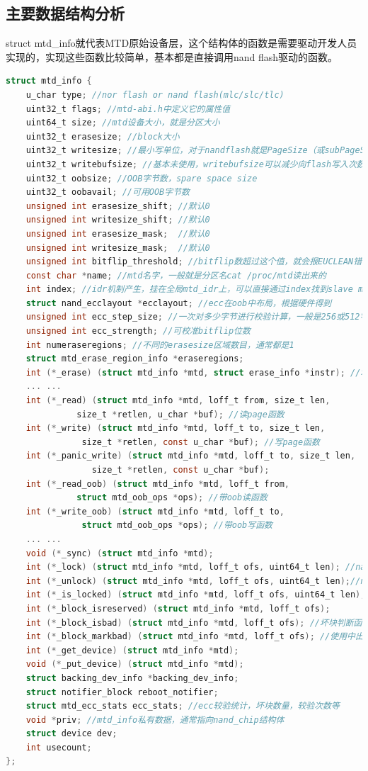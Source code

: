 \subsection{主要数据结构分析}
struct mtd\_info就代表MTD原始设备层，这个结构体的函数是需要驱动开发人员实现的，实现这些函数比较简单，基本都是直接调用nand flash驱动的函数。
\begin{lstlisting}[language=C]
struct mtd_info {
	u_char type; //nor flash or nand flash(mlc/slc/tlc)
	uint32_t flags; //mtd-abi.h中定义它的属性值
	uint64_t size; //mtd设备大小，就是分区大小
	uint32_t erasesize; //block大小
	uint32_t writesize; //最小写单位，对于nandflash就是PageSize（或subPageSize）
	uint32_t writebufsize; //基本未使用，writebufsize可以减少向flash写入次数
	uint32_t oobsize; //OOB字节数，spare space size
	uint32_t oobavail; //可用OOB字节数
	unsigned int erasesize_shift; //默认0
	unsigned int writesize_shift; //默认0
	unsigned int erasesize_mask;  //默认0
	unsigned int writesize_mask;  //默认0
	unsigned int bitflip_threshold; //bitflip数超过这个值，就会报EUCLEAN错误，这个值可以通过sysfs修改
	const char *name; //mtd名字，一般就是分区名cat /proc/mtd读出来的
	int index; //idr机制产生，挂在全局mtd_idr上，可以直接通过index找到slave mtd_info(后面用到)
	struct nand_ecclayout *ecclayout; //ecc在oob中布局，根据硬件得到
	unsigned int ecc_step_size; //一次对多少字节进行校验计算，一般是256或512字节
	unsigned int ecc_strength; //可校准bitflip位数
	int numeraseregions; //不同的erasesize区域数目，通常都是1
	struct mtd_erase_region_info *eraseregions;
	int (*_erase) (struct mtd_info *mtd, struct erase_info *instr); //块擦除函数，实现时会跳坏块
	... ...
	int (*_read) (struct mtd_info *mtd, loff_t from, size_t len,
		      size_t *retlen, u_char *buf); //读page函数
	int (*_write) (struct mtd_info *mtd, loff_t to, size_t len,
		       size_t *retlen, const u_char *buf); //写page函数
	int (*_panic_write) (struct mtd_info *mtd, loff_t to, size_t len,
			     size_t *retlen, const u_char *buf);
	int (*_read_oob) (struct mtd_info *mtd, loff_t from,
			  struct mtd_oob_ops *ops); //带oob读函数
	int (*_write_oob) (struct mtd_info *mtd, loff_t to,
			   struct mtd_oob_ops *ops); //带oob写函数
	... ...
	void (*_sync) (struct mtd_info *mtd);
	int (*_lock) (struct mtd_info *mtd, loff_t ofs, uint64_t len); //nandflash支持设备独占访问时定义
	int (*_unlock) (struct mtd_info *mtd, loff_t ofs, uint64_t len);//nandflash解锁
	int (*_is_locked) (struct mtd_info *mtd, loff_t ofs, uint64_t len);
	int (*_block_isreserved) (struct mtd_info *mtd, loff_t ofs);
	int (*_block_isbad) (struct mtd_info *mtd, loff_t ofs); //坏块判断函数
	int (*_block_markbad) (struct mtd_info *mtd, loff_t ofs); //使用中出现坏块时的标记函数
	int (*_get_device) (struct mtd_info *mtd);
	void (*_put_device) (struct mtd_info *mtd);
	struct backing_dev_info *backing_dev_info;
	struct notifier_block reboot_notifier;
	struct mtd_ecc_stats ecc_stats; //ecc较验统计，坏块数量，较验次数等
	void *priv; //mtd_info私有数据，通常指向nand_chip结构体
	struct device dev;
	int usecount;
};

\end{lstlisting}

